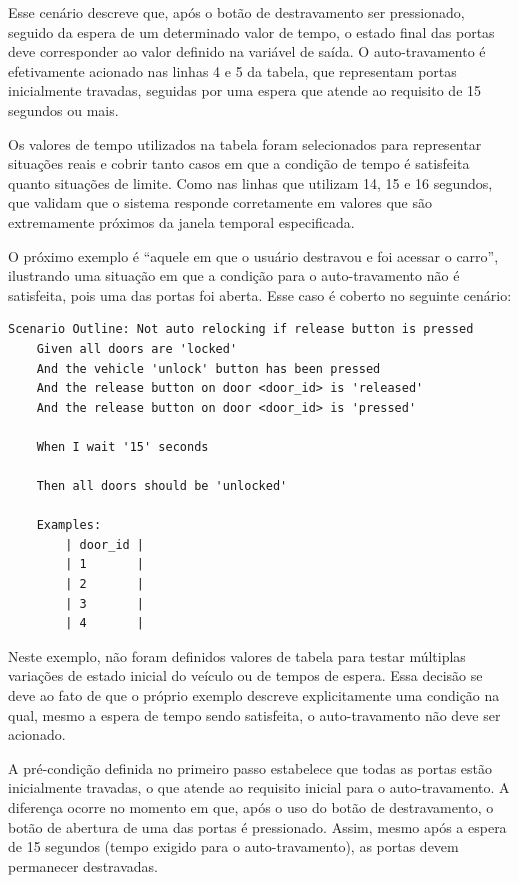 Esse cenário descreve que, após o botão de destravamento ser pressionado, seguido da espera de um determinado valor de tempo, o estado final das 
portas deve corresponder ao valor definido na variável de saída. O auto-travamento é efetivamente acionado nas linhas 4 e 5 da tabela, que representam 
portas inicialmente travadas, seguidas por uma espera que atende ao requisito de 15 segundos ou mais. 

Os valores de tempo utilizados na tabela foram selecionados para representar situações reais e cobrir tanto casos em que a condição de tempo é satisfeita 
quanto situações de limite. Como nas linhas que utilizam 14, 15 e 16 segundos, que validam que o sistema responde corretamente em valores que são extremamente 
próximos da janela temporal especificada.

O próximo exemplo é “aquele em que o usuário destravou e foi acessar o carro”, ilustrando uma situação em que a condição para o auto-travamento não é satisfeita, 
pois uma das portas foi aberta. Esse caso é coberto no seguinte cenário:

\begin{verbatim}
Scenario Outline: Not auto relocking if release button is pressed
    Given all doors are 'locked'
    And the vehicle 'unlock' button has been pressed
    And the release button on door <door_id> is 'released'
    And the release button on door <door_id> is 'pressed'

    When I wait '15' seconds

    Then all doors should be 'unlocked'

    Examples:
        | door_id |
        | 1       |
        | 2       |
        | 3       |
        | 4       |
\end{verbatim}

Neste exemplo, não foram definidos valores de tabela para testar múltiplas variações de estado inicial do veículo ou de tempos de espera. Essa decisão se deve ao 
fato de que o próprio exemplo descreve explicitamente uma condição na qual, mesmo a espera de tempo sendo satisfeita, o auto-travamento não deve ser acionado.

A pré-condição definida no primeiro passo estabelece que todas as portas estão inicialmente travadas, o que atende ao requisito inicial para o auto-travamento. 
A diferença ocorre no momento em que, após o uso do botão de destravamento, o botão de abertura de uma das portas é pressionado. Assim, mesmo após a espera de 
15 segundos (tempo exigido para o auto-travamento), as portas devem permanecer destravadas.

